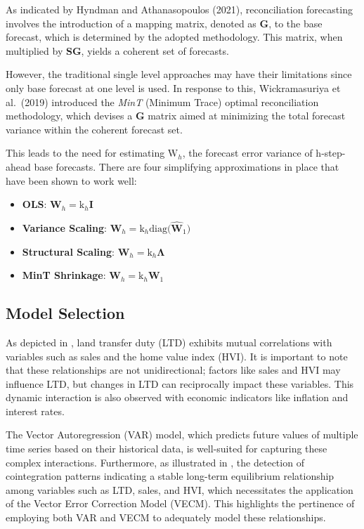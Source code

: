 \documentclass[11pt,a4paper,]{article}
\begin{document}
As indicated by Hyndman and Athanasopoulos (2021), reconciliation forecasting involves the introduction of a mapping matrix, denoted as \textbf{G}, to the base forecast, which is determined by the adopted methodology. This matrix, when multiplied by \textbf{SG}, yields a coherent set of forecasts.

However, the traditional single level approaches may have their limitations since only base forecast at one level is used. In response to this, Wickramasuriya et al.~(2019) introduced the \emph{MinT} (Minimum Trace) optimal reconciliation methodology, which devises a \textbf{G} matrix aimed at minimizing the total forecast variance within the coherent forecast set.

This leads to the need for estimating \(\text{W}_{h}\), the forecast error variance of h-step-ahead base forecasts. There are four simplifying approximations in place that have been shown to work well:

\begin{itemize}
\item
  \textbf{OLS}: \(\mathbf{W}_{h} = \text{k}_{h}\mathbf{I}\)
\item
  \textbf{Variance Scaling}: \(\mathbf{W}_{h} = \text{k}_{h}\text{diag(}\mathbf{\hat{W}}_{1}\text{)}\)
\item
  \textbf{Structural Scaling}: \(\mathbf{W}_{h} = \text{k}_{h}\mathbf{\Lambda}\)
\item
  \textbf{MinT Shrinkage}: \(\mathbf{W}_{h} = \text{k}_{h}\mathbf{W}_{1}\)
\end{itemize}

\subsection{Model Selection}\label{model-selection}

As depicted in \emph{}, land transfer duty (LTD) exhibits mutual correlations with variables such as sales and the home value index (HVI). It is important to note that these relationships are not unidirectional; factors like sales and HVI may influence LTD, but changes in LTD can reciprocally impact these variables. This dynamic interaction is also observed with economic indicators like inflation and interest rates.

The Vector Autoregression (VAR) model, which predicts future values of multiple time series based on their historical data, is well-suited for capturing these complex interactions. Furthermore, as illustrated in \emph{}, the detection of cointegration patterns indicating a stable long-term equilibrium relationship among variables such as LTD, sales, and HVI, which necessitates the application of the Vector Error Correction Model (VECM). This highlights the pertinence of employing both VAR and VECM to adequately model these relationships.
\end{document}
